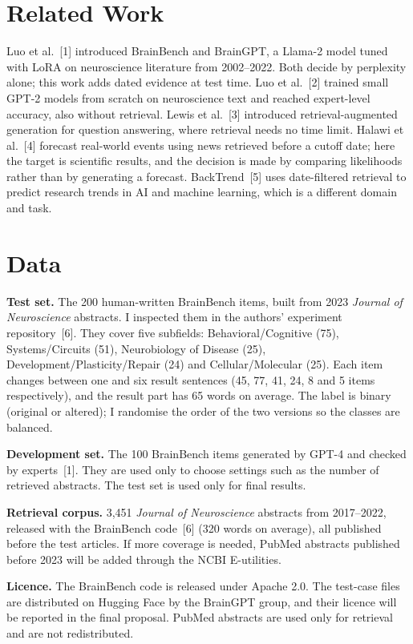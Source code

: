 \documentclass[10pt,a4paper]{article}
\begin{document}
\section{Related Work}
Luo et al.~[1] introduced BrainBench and BrainGPT, a Llama-2 model tuned with LoRA on neuroscience literature from 2002--2022. Both decide by perplexity alone; this work adds dated evidence at test time. Luo et al.~[2] trained small GPT-2 models from scratch on neuroscience text and reached expert-level accuracy, also without retrieval. Lewis et al.~[3] introduced retrieval-augmented generation for question answering, where retrieval needs no time limit. Halawi et al.~[4] forecast real-world events using news retrieved before a cutoff date; here the target is scientific results, and the decision is made by comparing likelihoods rather than by generating a forecast. BackTrend~[5] uses date-filtered retrieval to predict research trends in AI and machine learning, which is a different domain and task.

\section{Data}
\textbf{Test set.} The 200 human-written BrainBench items, built from 2023 \emph{Journal of Neuroscience} abstracts. I inspected them in the authors' experiment repository~[6]. They cover five subfields: Behavioral/Cognitive (75), Systems/Circuits (51), Neurobiology of Disease (25), Development/Plasticity/Repair (24) and Cellular/Molecular (25). Each item changes between one and six result sentences (45, 77, 41, 24, 8 and 5 items respectively), and the result part has 65 words on average. The label is binary (original or altered); I randomise the order of the two versions so the classes are balanced.

\textbf{Development set.} The 100 BrainBench items generated by GPT-4 and checked by experts~[1]. They are used only to choose settings such as the number of retrieved abstracts. The test set is used only for final results.

\textbf{Retrieval corpus.} 3,451 \emph{Journal of Neuroscience} abstracts from 2017--2022, released with the BrainBench code~[6] (320 words on average), all published before the test articles. If more coverage is needed, PubMed abstracts published before 2023 will be added through the NCBI E-utilities.

\textbf{Licence.} The BrainBench code is released under Apache 2.0. The test-case files are distributed on Hugging Face by the BrainGPT group, and their licence will be reported in the final proposal. PubMed abstracts are used only for retrieval and are not redistributed.
\end{document}
